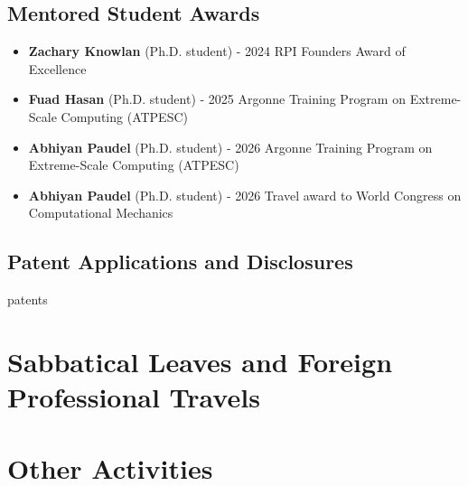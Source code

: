 \documentclass[11 pt]{rpibio}
\begin{document}
\subsection{Mentored Student Awards}
\begin{itemize}
  \item \textbf{Zachary Knowlan} (Ph.D. student) - 2024 RPI Founders Award of Excellence
  \item \textbf{Fuad Hasan} (Ph.D. student) - 2025 Argonne Training Program on Extreme-Scale Computing (ATPESC)
  \item \textbf{Abhiyan Paudel} (Ph.D. student) - 2026 Argonne Training Program on Extreme-Scale Computing (ATPESC)
  \item \textbf{Abhiyan Paudel} (Ph.D. student) - 2026 Travel award to World Congress on Computational Mechanics
\end{itemize}

\subsection{Patent Applications and Disclosures}
\begin{refcontext}[labelprefix=PA]{patents}
\printbibliography[type=patent, heading=none,resetnumbers=true]
\end{refcontext}


%

\section{Sabbatical Leaves and Foreign Professional Travels}
%



%

\section{Other Activities}
\end{document}
